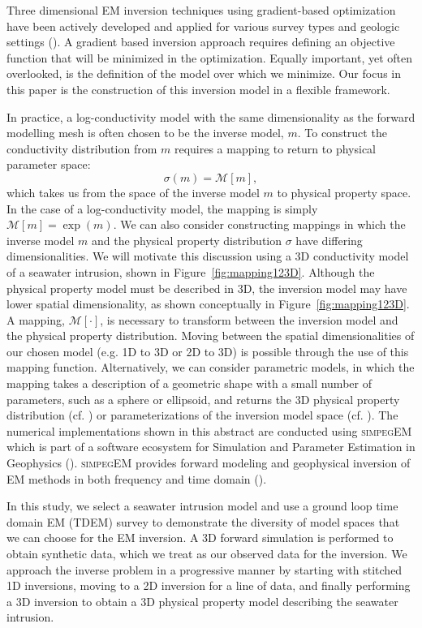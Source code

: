 \documentclass{segabs}
\newcommand{\simpegEM}{\textsc{simpegEM}\xspace}
\begin{document}
Three dimensional EM inversion techniques using gradient-based optimization have been actively developed and applied for various survey types and geologic settings  (\cite{Doug2013, Gribenko2007, Chung2014}). A gradient based inversion approach requires defining an objective function that will be minimized in the optimization. Equally important, yet often overlooked, is the definition of the model over which we minimize. Our focus in this paper is the construction of this inversion model in a flexible framework.

In practice, a log-conductivity model with the same dimensionality as the forward modelling mesh is often chosen to be the inverse model, $m$. To construct the conductivity distribution from $m$ requires a mapping to return to physical parameter space:
\begin{equation}
  \sigma(m)  = \mathcal{M}[m],
  \label{eq:generalMapping}
\end{equation}
which takes us from the space of the inverse model $m$ to physical property space. In the case of a log-conductivity model, the mapping is simply $\mathcal{M}[m] = \exp(m)$. We can also consider constructing mappings in which the inverse model $m$ and the physical property distribution $\sigma$ have differing dimensionalities. 
We will motivate this discussion using a 3D conductivity model of a seawater intrusion, shown in Figure~\ref{fig:mapping123D}.
Although the physical property model must be described in 3D, the inversion model may have lower spatial dimensionality, as shown conceptually in Figure~\ref{fig:mapping123D}.
A mapping, $\mathcal{M}[\cdot]$, is necessary to transform between the inversion model and the physical property distribution. Moving between the spatial dimensionalities of our chosen model (e.g. 1D to 3D or 2D to 3D) is possible through the use of this mapping function.  Alternatively, we can consider parametric models, in which the mapping takes a description of a geometric shape with a small number of parameters, such as a sphere or ellipsoid, and returns the 3D physical property distribution (cf. \cite{Adam2011, MikeParam2014}) or parameterizations of the inversion model space (cf. \cite{Heagy2014}). The numerical implementations shown in this abstract are conducted using \simpegEM which is part of a software ecosystem for Simulation and Parameter Estimation in Geophysics (\cite{SimPEG}). \simpegEM provides forward modeling and geophysical inversion of EM methods in both frequency and time domain (\cite{SimPEGEM}).

In this study, we select a seawater intrusion model and use a ground loop time domain EM (TDEM) survey to demonstrate the diversity of model spaces that we can choose for the EM inversion. A 3D forward simulation is performed to obtain synthetic data, which we treat as our observed data for the inversion. We approach the inverse problem in a progressive manner by starting with stitched 1D inversions, moving to a 2D inversion for a line of data, and finally performing a 3D inversion to obtain a 3D physical property model describing the seawater intrusion.
\end{document}
